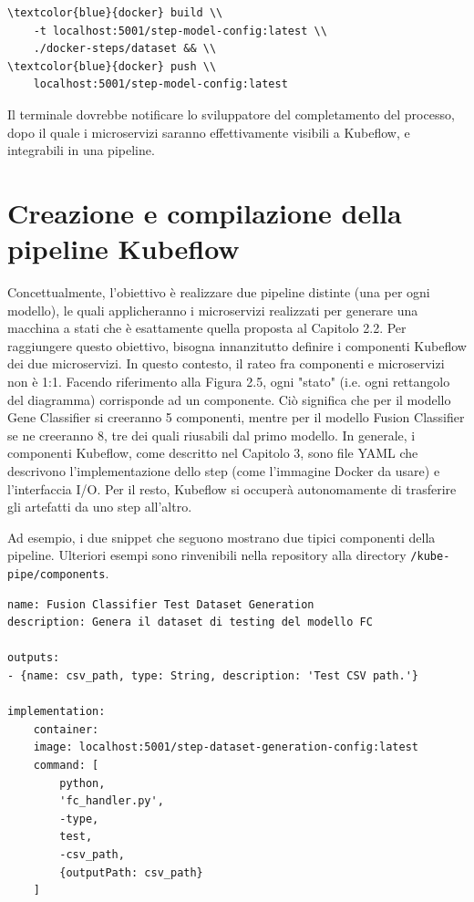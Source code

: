 \begin{small}
\begin{Verbatim}[commandchars=\\\{\}]
\textcolor{blue}{docker} build \\
    -t localhost:5001/step-model-config:latest \\
    ./docker-steps/dataset && \\
\textcolor{blue}{docker} push \\
    localhost:5001/step-model-config:latest
\end{Verbatim}
\end{small}

Il terminale dovrebbe notificare lo sviluppatore del completamento del processo, dopo il quale i microservizi saranno effettivamente visibili a Kubeflow, e integrabili in una pipeline.

\section{Creazione e compilazione della pipeline Kubeflow}

Concettualmente, l'obiettivo è realizzare due pipeline distinte (una per ogni modello), le quali applicheranno i microservizi realizzati per generare una macchina a stati che è esattamente quella proposta al Capitolo 2.2. Per raggiungere questo obiettivo, bisogna innanzitutto definire i componenti Kubeflow dei due microservizi. In questo contesto, il rateo fra componenti e microservizi non è 1:1. Facendo riferimento alla Figura 2.5, ogni "stato" (i.e. ogni rettangolo del diagramma) corrisponde ad un componente. Ciò significa che per il modello Gene Classifier si creeranno 5 componenti, mentre per il modello Fusion Classifier se ne creeranno 8, tre dei quali riusabili dal primo modello. In generale, i componenti Kubeflow, come descritto nel Capitolo 3, sono file YAML che descrivono l'implementazione dello step (come l'immagine Docker da usare) e l'interfaccia I/O. Per il resto, Kubeflow si occuperà autonomamente di trasferire gli artefatti da uno step all'altro.

Ad esempio, i due snippet che seguono mostrano due tipici componenti della pipeline. Ulteriori esempi sono rinvenibili nella repository alla directory {\small \verb|/kube-pipe/components|}.

\begin{code}
\label{code:apx:a:yaml}
\begin{verbatim}
name: Fusion Classifier Test Dataset Generation
description: Genera il dataset di testing del modello FC

outputs:
- {name: csv_path, type: String, description: 'Test CSV path.'}

implementation:
    container:
    image: localhost:5001/step-dataset-generation-config:latest
    command: [
        python,
        'fc_handler.py',
        -type,
        test,
        -csv_path, 
        {outputPath: csv_path}
    ]
\end{verbatim}
\end{code}

